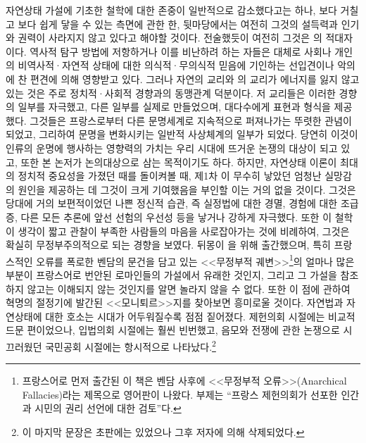 자연상태 가설에 기초한 철학에 대한 존중이 일반적으로 감소했다고는 하나,
보다 거칠고 보다 쉽게 닿을 수 있는 측면에 관한 한,
뒷마당에서는 여전히 그것의 설득력과 인기와 권력이 사라지지 않고 있다고
해야할 것이다.
전술했듯이 여전히 그것은 의 적대자이다.
역사적 탐구 방법에  저항하거나
이를 비난하려 하는 자들은
대체로 사회나 개인의 비역사적·자연적 상태에 대한 의식적·무의식적
믿음에 기인하는 선입견이나 악의에 찬 편견에 의해 영향받고 있다.
그러나 자연의 교리와 의 교리가 에너지를 잃지 않고 있는 것은
주로 정치적·사회적 경향과의 동맹관계 덕분이다.
저 교리들은 이러한 경향의 일부를 자극했고, 다른 일부를 실제로 만들었으며,
대다수에게 표현과 형식을 제공했다.
그것들은 프랑스로부터 다른 문명세계로 지속적으로 퍼져나가는 뚜렷한 관념이
되었고, 그리하여 문명을 변화시키는 일반적 사상체계의 일부가 되었다.
당연히 이것이 인류의 운명에 행사하는 영향력의 가치는 우리 시대에
뜨거운 논쟁의 대상이 되고 있고, 또한 본 논저가 논의대상으로 삼는
목적이기도 하다.
하지만, 자연상태 이론이 최대의 정치적 중요성을 가졌던 때를 돌이켜볼 때,
제1차 이 무수히 낳았던 엄청난 실망감의 원인을 제공하는 데
그것이 크게
기여했음을 부인할 이는 거의 없을 것이다.
그것은 당대에 거의 보편적이었던 나쁜 정신적 습관, 즉
실정법에 대한 경멸, 경험에 대한 조급증,
다른 모든 추론에 앞선 선험의 우선성 등을 낳거나
강하게 자극했다.
또한 이 철학이 생각이 짧고 관찰이 부족한 사람들의 마음을
사로잡아가는 것에 비례하여, 그것은 확실히 무정부주의적으로 되는 경향을 보였다.
뒤몽이 을 위해 출간했으며,
특히 프랑스적인 오류를 폭로한 벤담의 문건을 담고 있는
<<무정부적 궤변>>\footnote{%
  프랑스어로 먼저 출간된 이 책은
  벤담 사후에 <<무정부적 오류>>(Anarchical Fallacies)라는 제목으로
  영어판이 나왔다. 부제는
  ``프랑스 제헌의회가 선포한 인간과 시민의 권리 선언에 대한 검토''다.}의
얼마나 많은 부분이
프랑스어로 번안된 로마인들의 가설에서 유래한 것인지, 그리고
그 가설을 참조하지 않고는 이해되지 않는 것인지를 알면 놀라지 않을 수 없다.
또한 이 점에 관하여 혁명의 절정기에 발간된 <<모니퇴르>>지를
찾아보면 흥미로울 것이다.
자연법과 자연상태에 대한 호소는 시대가 어두워질수록 점점 짙어졌다.
제헌의회 시절에는 비교적 드문 편이었으나,
입법의회 시절에는 훨씬 빈번했고,
음모와 전쟁에 관한 논쟁으로 시끄러웠던 국민공회 시절에는
항시적으로 나타났다.\footnote{%
  이 마지막 문장은 초판에는 있었으나 그후 저자에 의해 삭제되었다.}

